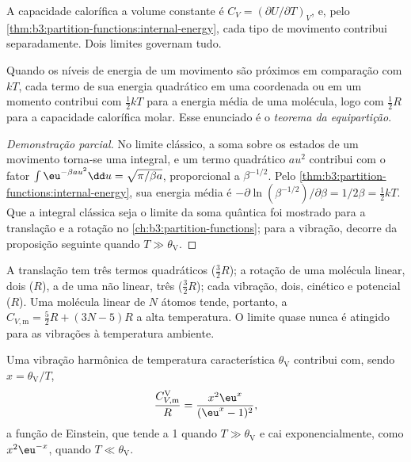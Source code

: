 A capacidade calorífica a volume constante é $C_V = (\partial U/\partial T)_V$, e,
pelo \cref{thm:b3:partition-functions:internal-energy}, cada tipo de movimento
contribui separadamente. Dois limites governam tudo.

\begin{theorem}\label{thm:b3:statistical-thermo-applied:equipartition}
Quando os níveis de energia de um movimento são próximos em comparação com $kT$,
cada termo de sua energia quadrático em uma coordenada ou em um momento contribui
com $\frac12kT$ para a energia média de uma molécula, logo com $\frac12R$ para a
capacidade calorífica molar. Esse enunciado é o \emph{teorema da equipartição}.
\end{theorem}

\begin{proof}[Demonstração parcial]
No limite clássico, a soma sobre os estados de um movimento torna-se uma
integral, e um termo quadrático $a u^2$ contribui com o fator $\int\eu^{-\beta au^2}\dd u =
\sqrt{\pi/\beta a}$, proporcional a $\beta^{-1/2}$. Pelo
\cref{thm:b3:partition-functions:internal-energy}, sua energia média é
$-\partial\ln(\beta^{-1/2})/\partial\beta = 1/2\beta = \frac12kT$. Que a integral clássica seja o
limite da soma quântica foi mostrado para a translação e a rotação no
\cref{ch:b3:partition-functions}; para a vibração, decorre da proposição
seguinte quando $T \gg \theta_{\mathrm V}$.
\end{proof}

A translação tem três termos quadráticos ($\frac32R$); a rotação de uma molécula
linear, dois ($R$), a de uma não linear, três ($\frac32R$); cada vibração, dois,
cinético e potencial ($R$). Uma molécula linear de $N$ átomos tende, portanto, a
$C_{V,\mathrm m} = \frac52R + (3N - 5)R$ a alta temperatura. O limite quase nunca é
atingido para as vibrações à temperatura ambiente.

\begin{proposition}\label{prop:b3:statistical-thermo-applied:cv-vib}
Uma vibração harmônica de temperatura característica $\theta_{\mathrm V}$ contribui com, sendo
$x = \theta_{\mathrm V}/T$,
\[
  \frac{C_{V,\mathrm m}^{\mathrm V}}{R} = \frac{x^2\eu^x}{(\eu^x - 1)^2},
\]
a função de Einstein, que tende a 1 quando $T \gg \theta_{\mathrm V}$ e cai
exponencialmente, como $x^2\eu^{-x}$, quando $T \ll \theta_{\mathrm V}$.
\end{proposition}


